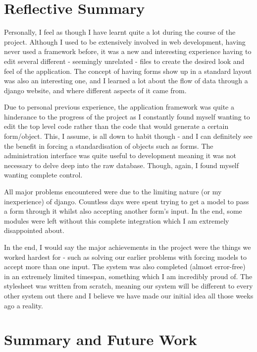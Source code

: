 \documentclass{sig-alt-release2}
\begin{document}

\section{Reflective Summary}
Personally, I feel as though I have learnt quite a lot during the course of the project. Although I used to be extensively involved in web development, having never used a framework before, it was a new and interesting experience having to edit several different - seemingly unrelated - files to create the desired look and feel of the application. The concept of having forms show up in a standard layout was also an interesting one, and I learned a lot about the flow of data through a django website, and where different aspects of it came from.

Due to personal previous experience, the application framework was quite a hinderance to the progress of the project as I constantly found myself wanting to edit the top level code rather than the code that would generate a certain form/object. This, I assume, is all down to habit though - and I can definitely see the benefit in forcing a standardisation of objects such as forms. 
The administration interface was quite useful to development meaning it was not necessary to delve deep into the raw database. Though, again, I found myself wanting complete control.

All major problems encountered were due to the limiting nature (or my inexperience) of django. Countless days were spent trying to get a model to pass a form through it whilst also accepting another form's input. In the end, some modules were left without this complete integration which I am extremely disappointed about. 

In the end, I would say the major achievements in the project were the things we worked hardest for - such as solving our earlier problems with forcing models to accept more than one input. The system was also completed (almost error-free) in an extremely limited timespan, something which I am incredibly proud of. The stylesheet was written from scratch, meaning our system will be different to every other system out there and I believe we have made our initial idea all those weeks ago a reality. 


\section{Summary and Future Work}
\end{document}
